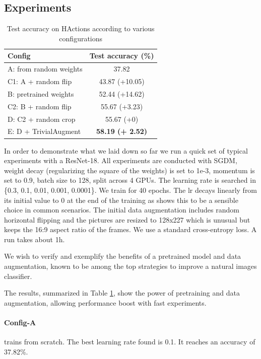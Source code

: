 \subsection{Experiments}

\begin{table}[]
    \centering
    \begin{tabular}{|l|c|}
    \hline
        \textbf{Config} & \textbf{Test accuracy (\%)} \\
    \hline
        A: from random weights & 37.82 \\
    \hline
        C1: A + random flip & 43.87 (+10.05)\\
    \hline
        B: pretrained weights & 52.44 (+14.62) \\
    \hline
        C2: B + random flip & 55.67 (+3.23) \\
    \hline
        D: C2 + random crop & 55.67 (+0) \\
    \hline
        E: D + TrivialAugment & \textbf{58.19 (+ 2.52)} \\
    \hline
    \end{tabular}
    \caption{Test accuracy on HActions according to various configurations}
    \label{tab:hactivity_results}
\end{table}

In order to demonstrate what we laid down so far we run a quick set of typical experiments with a ResNet-18. All experiments are conducted with SGDM, weight decay (regularizing the square of the weights) is set to 1e-3, momentum is set to 0.9, batch size to 128, split across 4 GPUs. The learning rate is searched in \{0.3, 0.1, 0.01, 0.001, 0.0001\}. We train for 40 epochs. The \ac{lr} decays linearly from its initial value to 0 at the end of the training as \citep{lineardecay} shows this to be a sensible choice in common scenarios. The initial data augmentation includes random horizontal flipping and the pictures are resized to 128x227 which is unusual but keeps the 16:9 aspect ratio of the frames. We use a standard cross-entropy loss. A run takes about 1h.

We wish to verify and exemplify the benefits of a pretrained model and data augmentation, known to be among the top strategies to improve a natural images classifier.

The results, summarized in Table \ref{tab:hactivity_results}, show the power of pretraining and data augmentation, allowing performance boost with fast experiments. 

\paragraph{Config-A} trains from scratch. The best learning rate found is 0.1. It reaches an accuracy of 37.82\%.

